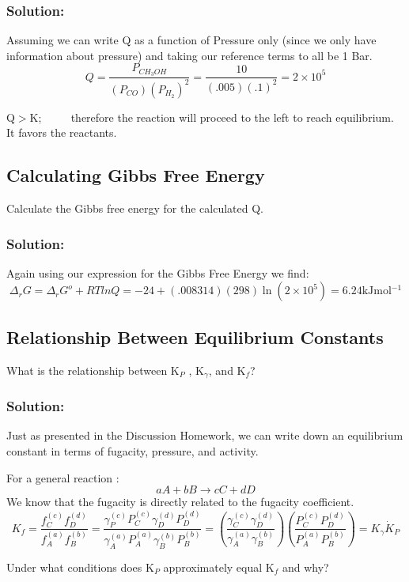 \documentclass{article}
\newcommand{\be}{\begin{equation}}
\newcommand{\ee}{\end{equation}}
\begin{document}
\subsubsection*{Solution:}
Assuming we can write Q as a function of Pressure only (since we only have information about pressure) and taking our reference terms to all be 1 Bar.
\be
Q =\frac{P_{CH_3OH}}{(P_{CO})(P_{H_2})^2} = \frac{10}{(.005)(.1)^2} = 2 \times 10^5 
\ee

Q$>$K; $\qquad$ therefore the reaction will proceed to the left to reach equilibrium.
It favors the reactants.
\bigskip

\subsection{Calculating Gibbs Free Energy}
Calculate the Gibbs free energy for the calculated Q.

\subsubsection*{Solution:}
Again using our expression for the Gibbs Free Energy we find:
\be
\Delta_rG = \Delta_rG^o +RTlnQ = -24 + (.008314)(298)\ln(2 \times 10^5 ) = 6.24\text{kJmol$^{-1}$}
\ee
\bigskip

\subsection{Relationship Between Equilibrium Constants}
What is the relationship between K$_P$ , K$_{\gamma}$, and K$_f$?

\subsubsection*{Solution:}
Just as presented in the Discussion Homework, we can write down an equilibrium constant in terms of fugacity, pressure, and activity. 

For a general reaction :
\be 
aA + bB \rightarrow cC + dD
\ee
We know that the fugacity is directly related to the fugacity coefficient. 
\be
K_f = \frac{{f^{(c)}_Cf^{(d)}_D}}{{f^{(a)}_Af^{(b)}_B}} = \frac{{\gamma^{(c)}_PP^{(c)}_C\gamma^{(d)}_DP^{(d)}_D}}{{\gamma^{(a)}_AP^{(a)}_A\gamma^{(b)}_B}P^{(b)}_B} = \left(\frac{\gamma^{(c)}_C\gamma^{(d)}_D}{\gamma^{(a)}_A\gamma^{(b)}_B}\right)
\left(\frac{P^{(c)}_CP^{(d)}_D}{P^{(a)}_AP^{(b)}_B}\right) = K_\gamma \dot K_P
\ee

\bigskip
Under what conditions does  K$_P$ approximately equal K$_f$ and why?
\end{document}
